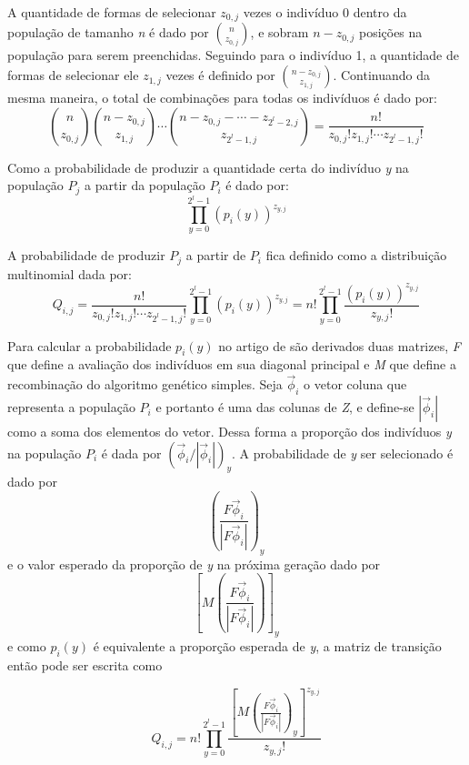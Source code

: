 A quantidade de formas de selecionar \(z_{0,j}\) vezes o indivíduo 0 dentro da população de tamanho \textit{n} é dado por \(\binom{n}{z_{0,j}}\), e sobram \(n - z_{0,j}\) posições na população para serem preenchidas. Seguindo para o indivíduo 1, a quantidade de formas de selecionar ele \(z_{1,j}\) vezes é definido por \(\binom{n-z_{0,j}}{z_{1,j}}\). Continuando da mesma maneira, o total de combinações para todas os indivíduos é dado por:
\begin{equation*}
\binom{n}{z_{0,j}}\binom{n-z_{0,j}}{z_{1,j}}\cdots \binom{n-z_{0,j}-\cdots -z_{2^l-2,j}}{z_{2^l-1,j}} = \frac{n!}{z_{0,j}!z_{1,j}!\cdots z_{2^l-1,j}!}
\end{equation*}

Como a probabilidade de produzir a quantidade certa do indivíduo \textit{y} na população \(P_j\) a partir da população \(P_i\) é dado por:
\[ \prod_{y=0}^{2^l-1}\left(p_i(y)\right)^{z_{y,j}} \]

A probabilidade de produzir \(P_j\) a partir de \(P_i\) fica definido como a distribuição multinomial dada por:
\begin{equation*}
Q_{i,j} = \frac{n!}{z_{0,j}!z_{1,j}!\cdots z_{2^l-1,j}!} \prod_{y=0}^{2^l-1}\left(p_i(y)\right)^{z_{y,j}} = n!\prod_{y=0}^{2^l-1} \frac{\left(p_i(y)\right)^{z_{y,j}}}{z_{y,j}!}
\end{equation*}

Para calcular a probabilidade \(p_i(y)\) no artigo de  são derivados duas matrizes, \textit{F} que define a avaliação dos indivíduos em sua diagonal principal e \textit{M} que define a recombinação do algoritmo genético simples. Seja \(\overrightarrow{\phi}_i\) o vetor coluna que representa a população \(P_i\) e portanto é uma das colunas de \textit{Z}, e define-se \(\left| \overrightarrow{\phi}_i \right|\) como a soma dos elementos do vetor. Dessa forma a proporção dos indivíduos \textit{y} na população \(P_i\) é dada por \((\overrightarrow{\phi}_i / \left| \overrightarrow{\phi}_i \right| )_y\).
A probabilidade de \textit{y} ser selecionado é dado por
\[\left( \frac{F \overrightarrow{\phi}_i}{\left| F \overrightarrow{\phi}_i \right|} \right)_y\]
e o valor esperado da proporção de \textit{y} na próxima geração dado por
\[\left[ M \left( \frac{F \overrightarrow{\phi}_i}{\left| F \overrightarrow{\phi}_i \right|} \right) \right]_y\]
e como \(p_i(y)\) é equivalente a proporção esperada de \textit{y}, a matriz de transição então pode ser escrita como 

\begin{equation*}
Q_{i,j} = n!\prod_{y=0}^{2^l-1} \frac{\left[ M \left( \frac{F \overrightarrow{\phi}_i}{\left| F \overrightarrow{\phi}_i \right|} \right)_y \right]^{z_{y,j}}}{z_{y,j}!}
\end{equation*}

